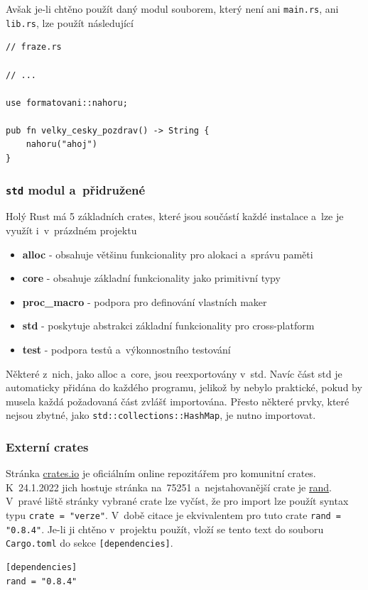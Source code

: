 \documentclass[a4paper, 12pt, twoside]{article} %
\newcommand{\rust}[1]{\texttt{#1}}
\begin{document}
		Avšak je-li chtěno použít daný modul souborem, který není ani \texttt{main.rs}, ani \texttt{lib.rs}, lze použít následující
		\begin{verbatim}
// fraze.rs

// ...

use formatovani::nahoru;

pub fn velky_cesky_pozdrav() -> String {
	nahoru("ahoj")
}
		\end{verbatim}
		
		
		\subsubsection*{\rust{std} modul a~přidružené}
			Holý Rust má 5 základních crates, které jsou součástí každé instalace a~lze je využít i~v~prázdném projektu
			\begin{itemize}
				\item \textbf{alloc} - obsahuje většinu funkcionality pro alokaci a~správu paměti
				\item \textbf{core} - obsahuje základní funkcionality jako primitivní typy
				\item \textbf{proc\_macro} - podpora pro definování vlastních maker
				\item \textbf{std} - poskytuje abstrakci základní funkcionality pro cross-platform
				\item \textbf{test} - podpora testů a~výkonnostního testování
			\end{itemize}

			Některé z~nich, jako alloc a~core, jsou reexportovány v~std. Navíc část std je automaticky přidána do každého programu, jelikož by nebylo praktické, pokud by musela každá požadovaná část zvlášť importována. Přesto některé prvky, které nejsou zbytné, jako \rust{std::collections::HashMap}, je nutno importovat.

		\subsubsection*{Externí crates}
			Stránka \href{https://crates.io/}{crates.io} je oficiálním online repozitářem pro komunitní crates. K~24.1.2022 jich hostuje stránka na~75251 a~nejstahovanější crate je \href{https://crates.io/crates/rand}{rand}. V~pravé liště stránky vybrané crate lze vyčíst, že pro import lze použít syntax typu \texttt{crate = "verze"}. V~době citace je ekvivalentem pro tuto crate \texttt{rand = "0.8.4"}. Je-li ji chtěno v~projektu použít, vloží se tento text do souboru \texttt{Cargo.toml} do sekce \texttt{[dependencies]}.
			\begin{verbatim}
[dependencies]
rand = "0.8.4"
			\end{verbatim}
		
\end{document}

